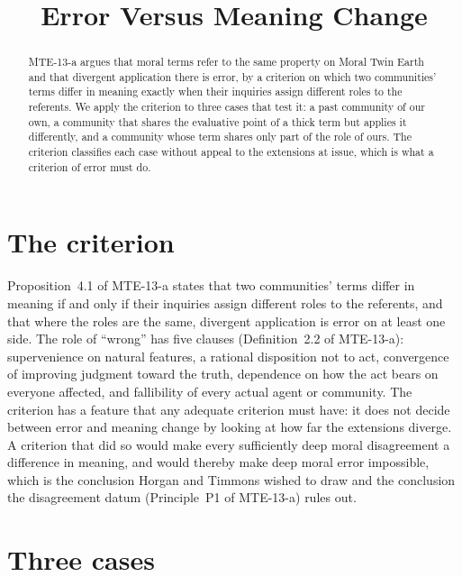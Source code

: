\documentclass{situationist-preprint}
\title{Error Versus Meaning Change}
\begin{document}
\maketitle

\begin{abstract}
MTE-13-a argues that moral terms refer to the same property on Moral Twin Earth and that divergent application there is error, by a criterion on which two communities' terms differ in meaning exactly when their inquiries assign different roles to the referents. We apply the criterion to three cases that test it: a past community of our own, a community that shares the evaluative point of a thick term but applies it differently, and a community whose term shares only part of the role of ours. The criterion classifies each case without appeal to the extensions at issue, which is what a criterion of error must do.
\end{abstract}

\section{The criterion}

Proposition~4.1 of MTE-13-a states that two communities' terms differ in meaning if and only if their inquiries assign different roles to the referents, and that where the roles are the same, divergent application is error on at least one side. The role of \enquote{wrong} has five clauses (Definition~2.2 of MTE-13-a): supervenience on natural features, a rational disposition not to act, convergence of improving judgment toward the truth, dependence on how the act bears on everyone affected, and fallibility of every actual agent or community. The criterion has a feature that any adequate criterion must have: it does not decide between error and meaning change by looking at how far the extensions diverge. A criterion that did so would make every sufficiently deep moral disagreement a difference in meaning, and would thereby make deep moral error impossible, which is the conclusion Horgan and Timmons wished to draw \citep{HorganTimmons1992a} and the conclusion the disagreement datum (Principle~P1 of MTE-13-a) rules out.

\section{Three cases}
\end{document}
